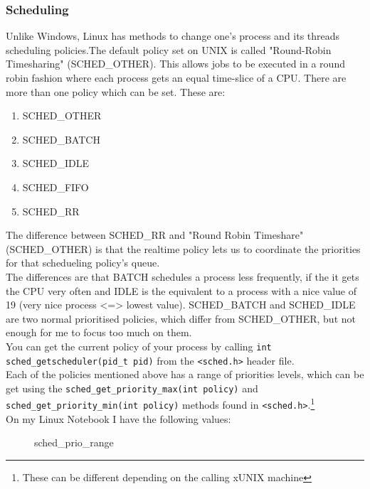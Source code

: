 \subsubsection{Scheduling}
\label{ssec:sched_policies}
Unlike Windows, Linux has methods to change one's process and its threads scheduling policies.The default policy set on UNIX
is called "Round-Robin Timesharing" (SCHED\_OTHER). This allows jobs to be executed in a round robin fashion where
each process gets an equal time-slice of a CPU. There are more than one policy which can be set.
These are:
\begin{enumerate}
	\item SCHED\_OTHER
	\item SCHED\_BATCH
	\item SCHED\_IDLE
	\item SCHED\_FIFO
	\item SCHED\_RR
\end{enumerate}
The difference between SCHED\_RR and "Round Robin Timeshare"(SCHED\_OTHER) is that the realtime policy lets
us to coordinate the priorities for that schedueling policy's queue.\\
The differences are that BATCH schedules a process less
frequently, if the it gets the CPU very often and IDLE is the equivalent to a process with a nice value of 19
(very nice process <=> lowest value).
SCHED\_BATCH and SCHED\_IDLE are two normal prioritised policies, which differ from SCHED\_OTHER, but
not enough for me to focus too much on them.\\
You can get the current policy of your process by calling \texttt{int sched\_getscheduler(pid\_t pid)} from the \texttt{<sched.h>} header file. 
\\
Each of the policies mentioned above has a range of priorities levels, which can be get using the \texttt{sched\_get\_priority\_max(int policy)} and \texttt{sched\_get\_priority\_min(int policy)} methods found in \texttt{<sched.h>}.\footnote{These can be different depending on the calling xUNIX
machine}\\
On my Linux Notebook I have the following values:
\begin{figure}[!htb]
	\centering
	\caption{sched\_prio\_range} 
	\label{sched_prio_range}
\end{figure}
